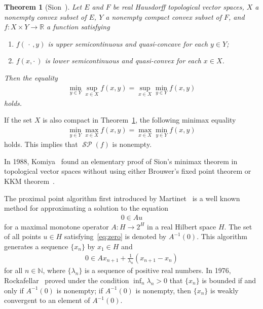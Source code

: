 \documentclass[draft]{amsart}
\numberwithin{equation}{section}
\def\N{\mathbb N}
\def\R{\mathbb R}
\DeclareMathOperator{\Saddle}{\mathcal{SP}}
\theoremstyle{plain}
\newtheorem{theorem}{Theorem}[section]
\theoremstyle{definition}
\theoremstyle{remark}
\begin{document}
 \begin{theorem}[Sion~{\cite[Theorem~3.4]{MR0097026}}]\label{thm:Sion-minimax}
 Let $E$ and $F$ be real Hausdorff topological vector spaces, 
 $X$ a nonempty convex subset of $E$, 
 $Y$ a nonempty compact convex subset of $F$, 
 and $f\colon X\times Y\to \R$ a function satisfying 
 \begin{enumerate}
  \item[(i)] $f(\,\cdot\,,y)$ is upper semicontinuous 
 and quasi-concave for each $y\in Y$; 
  \item[(ii)] $f(x,\cdot \,)$ is lower semicontinuous 
 and quasi-convex for each $x\in X$. 
 \end{enumerate}
 Then the equality 
 \begin{align}
  \min_{y\in Y} \sup_{x\in X} f(x,y) = \sup_{x\in X}\min_{y\in Y} f(x,y)
 \end{align}
 holds. 
\end{theorem}

If the set $X$ is also compact in Theorem~\ref{thm:Sion-minimax}, 
the following minimax equality 
 \begin{align}
  \min_{y\in Y} \max_{x\in X} f(x,y) = \max_{x\in X}\min_{y\in Y} f(x,y)
 \end{align}
holds. This implies that $\Saddle (f)$ is nonempty. 

In 1988, Komiya~\cite{MR0930413} found an elementary proof of Sion's minimax theorem 
in topological vector spaces without using either Brouwer's fixed point theorem or 
KKM theorem~\cites{KKM-FundMath29, MR2184742}. 

The proximal point algorithm first introduced by 
Martinet~\cite{MR0298899} is a well known method for 
approximating a solution to the equation 
\begin{align}\label{eq:zero}
 0\in Au 
\end{align} 
for a maximal monotone operator $A\colon H\to 2^H$ in a real 
Hilbert space $H$. The set of all points $u\in H$ 
satisfying~\eqref{eq:zero} is denoted by $A^{-1}(0)$. 
This algorithm generates a sequence $\{x_n\}$ 
by $x_1\in H$ and 
\begin{align}
 0 \in Ax_{n+1} + \frac{1}{\lambda_n} (x_{n+1}-x_n)
\end{align}
for all $n\in \N$, where $\{\lambda_n\}$ is a sequence of positive real numbers. 
In 1976, Rockafellar~\cite{MR0410483} proved 
under the condition $\inf_n\lambda_n >0$ that 
$\{x_n\}$ is bounded if and only if $A^{-1}(0)$ is nonempty; 
if $A^{-1}(0)$ is nonempty, then $\{x_n\}$ is 
weakly convergent to an element of $A^{-1}(0)$. 
\end{document}
